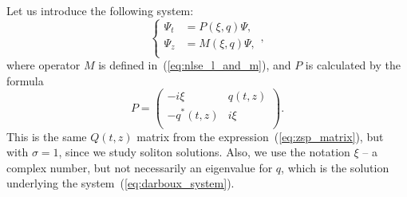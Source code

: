 Let us introduce the following system: 
\begin{equation}
    \left\{
    \begin{aligned}
        \Psi_t & = P(\xi,q)\Psi {,} \\
        \Psi_z & = M(\xi,q)\Psi {,} \\
    \end{aligned}
    \right. {,}
    \label{eq:darboux_system}
\end{equation}
where operator $M$ is defined in~(\ref{eq:nlse_l_and_m}), and $P$ is calculated by the formula
\begin{equation}
    P = 
    \begin{pmatrix}
        -i \xi & q(t,z) \\
        - q^{*} (t,z) & i \xi \\
    \end{pmatrix} {.}
\end{equation}
This is the same $ Q (t, z) $ matrix from the expression~(\ref{eq:zsp_matrix}), but with $ \sigma = 1 $, since we study soliton solutions. Also, we use the notation $ \xi $ -- a complex number, but not necessarily an eigenvalue for $ q $, which is the solution underlying the system~(\ref{eq:darboux_system}).



